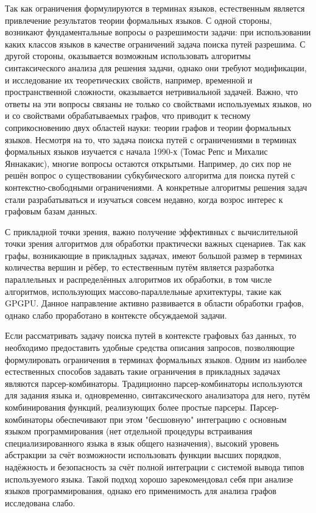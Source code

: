 \documentclass[12pt]{article}  %
\theoremstyle{remark}
\begin{document}
Так как ограничения формулируются в терминах языков, естественным является привлечение результатов теории формальных языков.
С одной стороны, возникают фундаментальные вопросы о разрешимости задачи: при использовании каких классов языков в качестве ограничений задача поиска путей разрешима.
С другой стороны, оказывается возможным использовать алгоритмы синтаксического анализа для решения задачи, однако они требуют модификации, и исследование их теоретических свойств, например, временной и пространственной сложности, оказывается нетривиальной задачей.
Важно, что ответы на эти вопросы связаны не только со свойствами используемых языков, но и со свойствами обрабатываемых графов, что приводит к тесному соприкосновению двух областей науки: теории графов и теории формальных языков.
Несмотря на то, что задача поиска путей с ограничениями в терминах формальных языков изучается с начала 1990-х (Томас Репс и Михалис Яннакакис), многие вопросы остаются открытыми.
Например, до сих пор не решён вопрос о существовании субкубического алгоритма для поиска путей с контекстно-свободными ограничениями.
А конкретные алгоритмы решения задач стали разрабатываться и изучаться совсем недавно, когда возрос интерес к графовым базам данных.

С прикладной точки зрения, важно получение эффективных с вычислительной точки зрения алгоритмов для обработки практически важных сценариев.
Так как графы, возникающие в прикладных задачах, имеют большой размер в терминах количества вершин и рёбер, то естественным путём является разработка параллельных и распределённых алгоритмов их обработки, в том числе алгоритмов, использующих массово-параллельные архитектуры, такие как GPGPU.
Данное направление активно развивается в области обработки графов, однако слабо проработано в контексте обсуждаемой задачи.

Если рассматривать задачу поиска путей в контексте графовых баз данных, то необходимо предоставить удобные средства описания запросов, позволяющие формулировать ограничения в терминах формальных языков.
Одним из наиболее естественных способов задавать такие ограничения в прикладных задачах являются парсер-комбинаторы.
Традиционно парсер-комбинаторы используются для задания языка и, одновременно, синтаксического анализатора для него, путём комбинирования функций, реализующих более простые парсеры.
Парсер-комбинаторы обеспечивают при этом "бесшовную" интеграцию с основным языком программирования (нет отдельной процедуры встраивания специализированного языка в язык общего назначения), высокий уровень абстракции за счёт возможности использовать функции высших порядков, надёжность и безопасность за счёт полной интеграции с системой вывода типов используемого языка.
Такой подход хорошо зарекомендовал себя при анализе языков программирования, однако его применимость для анализа графов исследована слабо.
\end{document}
